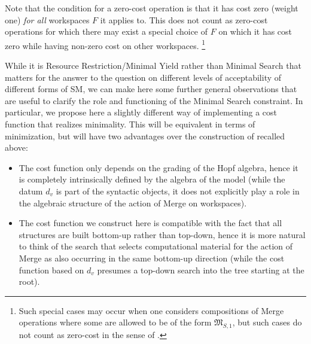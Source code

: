 \documentclass[12pt]{amsart}
\numberwithin{equation}{section}
\def\fM{{\mathfrak M}}
\begin{document}
 \smallskip
 
 Note that the condition for a zero-cost operation is that
 it has cost zero (weight one) {\em for all} workspaces $F$ 
 it applies to. This does not count as zero-cost operations
 for which there may exist a special choice of $F$ on which
 it has cost zero while having non-zero cost on other workspaces.
 \footnote{Such special cases may occur when one considers compositions
 of Merge operations where some are allowed to be of the form
 $\fM_{S,1}$, but such cases do not count as zero-cost in the sense 
 of \cite{MCB}.}
 
 \smallskip
 
 While it is Resource Restriction/Minimal Yield rather than Minimal Search 
 that matters for the answer to the question on different levels of
 acceptability of different forms of SM, we can make here some further 
 general observations that are useful to clarify the role and functioning
 of the Minimal Search constraint. In particular, we propose here 
 a slightly different way of implementing a cost function that realizes
 minimality. This will be equivalent in terms of minimization, but will
 have two advantages over the construction of \cite{MCB} recalled above:
 \begin{itemize}
 \item The cost function only depends on the grading of the Hopf algebra, hence it is completely
 intrinsically defined by the algebra of the model (while the datum $d_v$ is part of the
 syntactic objects, it does not explicitly play a role in the algebraic structure of the action of
 Merge on workspaces).
 \item The cost function we construct here is compatible with the fact that all structures
 are built bottom-up rather than top-down, hence it is more natural to think of the search
 that selects computational material for the action of Merge as also occurring in the same
 bottom-up direction (while the cost function based on $d_v$ presumes a top-down
 search into the tree starting at the root).
 \end{itemize}
 
 \smallskip
 
\end{document}

